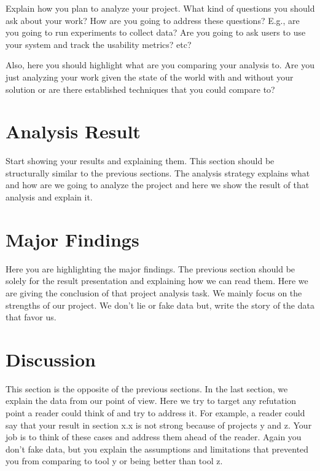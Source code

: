 Explain how you plan to analyze your project. What kind of questions you should ask about your work? How are you going to address these questions? E.g., are you going to run experiments to collect data? Are you going to ask users to use your system and track the usability metrics? etc?

Also, here you should highlight what are you comparing your analysis to. Are you just analyzing your work given the state of the world with and without your solution or are there established techniques that you could compare to?


\section{Analysis Result} %
\label{sec:analysis_result}

Start showing your results and explaining them. This section should be structurally similar to the previous sections. The analysis strategy explains what and how are we going to analyze the project and here we show the result of that analysis and explain it.


\section{Major Findings} %
\label{sec:major_findings}

Here you are highlighting the major findings. The previous section should be solely for the result presentation and explaining how we can read them. Here we are giving the conclusion of that project analysis task. We mainly focus on the strengths of our project. We don't lie or fake data but, write the story of the data that favor us.


\section{Discussion} %
\label{sec:discussion}

This section is the opposite of the previous sections. In the last section, we explain the data from our point of view. Here we try to target any refutation point a reader could think of and try to address it. For example, a reader could say that your result in section x.x is not strong because of projects y and z. Your job is to think of these cases and address them ahead of the reader. Again you don't fake data, but you explain the assumptions and limitations that prevented you from comparing to tool y or being better than tool z.

